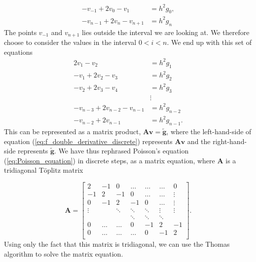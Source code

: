 \documentclass{emulateapj}
\begin{document}
        \begin{align*}
            -v_{-1} + 2v_{0} - v_{1} &= h^{2} g_{0},
            \\
            -v_{n-1} + 2v_{n} - v_{n+1} &= h^{2} g_{n}
        \end{align*}
        The points $v_{-1}$ and $v_{n+1}$ lies outside the interval we are looking at. We therefore choose to consider the values in the interval \(0 < i < n\). We end up with this set of equations
        \begin{align*}
            2v_{1} - v_{2} &= h^{2} g_{1} \\
            -v_{1} + 2v_{2} - v_{3} &= h^{2} g_{2} \\
            -v_{2} + 2v_{3} - v_{4} &= h^{2} g_{3} \\
            &\vdots \\
            -v_{n-3} + 2v_{n-2} - v_{n-1} &= h^{2} g_{n-2} \\
            -v_{n-2} + 2v_{n-1} &= h^{2} g_{n-1}.
        \end{align*}
        This can be represented as a matrix product, \(\textbf{A}\textbf{v} = \widetilde{\textbf{g}}\), where the left-hand-side of equation (\ref{eq:f_double_derivative_discrete}) represents \(\textbf{A}\textbf{v}\) and the right-hand-side represents \(\widetilde{\textbf{g}}\). We have thus rephrased Poisson's equation (\ref{eq:Poisson_equation}) in discrete steps, as a matrix equation, where \(\textbf{A}\) is a tridiagonal T\"oplitz matrix
        
        \begin{equation*}
        \mathbf{A} = \begin{bmatrix}
                           2      & -1     & 0      & \ldots & \ldots & \ldots & 0      \\
                           -1     & 2      & -1     & 0      & \ldots & \ldots & \vdots \\
                           0      & -1     & 2      & -1     & 0      & \ldots & \vdots \\
                           \vdots &        & \ddots & \ddots & \ddots & \vdots & \vdots \\
                                  &        &        & \ddots & \ddots & \ddots &        \\
                           0      & \ldots & \ldots & 0      & -1     & 2      & -1     \\
                           0      & \ldots & \ldots & \ldots & 0      & -1     & 2      \\
                      \end{bmatrix}.
        \end{equation*}
        Using only the fact that this matrix is tridiagonal, we can use the Thomas algorithm to solve the matrix equation.
    
\end{document}
